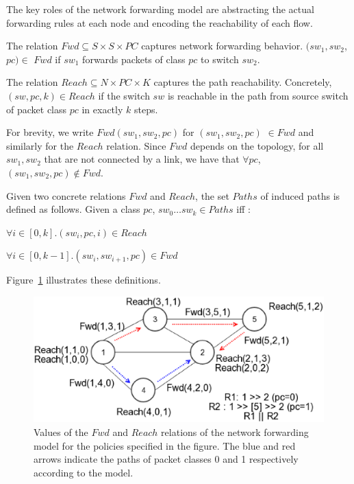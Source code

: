 The key roles of the network forwarding model are abstracting the actual forwarding rules at each node and encoding the reachability of each flow. 
\begin{mydef}
\label{def:fwd}
The relation $Fwd \subseteq S \times S \times PC $ captures network forwarding behavior. 
$(sw_1, sw_2$, $pc)\in$ $Fwd$ if 
$sw_1$ forwards packets of class $pc$ to switch $sw_2$. 
\end{mydef}
\begin{mydef}
\label{def:reach}
	The relation $Reach \subseteq N \times PC \times K$ captures the path reachability.   
	Concretely, $(sw, pc, k)\in Reach$ if 
	the switch $sw$ is reachable in the path from source switch of packet class $pc$ in exactly $k$ steps.  
\end{mydef}
For brevity, we write $Fwd(sw_1, sw_2, pc)$ for $(sw_1, sw_2, pc) $ $\in Fwd$ and similarly for the $Reach$ relation. 
Since $Fwd$ depends on the topology,
for all $sw_1, sw_2$ that are not connected by a link, 
we have that $\forall pc$, $(sw_1,sw_2,pc) \notin Fwd$. 

Given two concrete relations $Fwd$ and $Reach$, 
the set $Paths$ of induced paths is defined as follows.
Given a class $pc$,  $sw_0 \ldots sw_k \in Paths$ iff : 
\begin{compactenumerate}
	\item $\forall i \in [0,k]. (sw_i, pc, i) \in Reach$
	\item $\forall i \in [0, k - 1]. (sw_i, sw_{i+1}, pc) \in Fwd$
\end{compactenumerate}
Figure~\ref{fig:model} illustrates these definitions.

\begin{figure}[!thb]
	\centering
	\includegraphics[width=0.8\columnwidth]{figures/network-model-example.eps}
	\caption{Values of the $Fwd$ and $Reach$ relations of the network forwarding model
		 for the policies specified in the figure. The blue and red arrows indicate the 
		 paths of packet classes 0 and 1 respectively according to the model.}
	\label{fig:model}
\end{figure}


